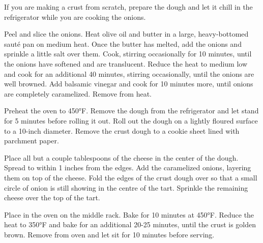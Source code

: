 If you are making a crust from scratch, prepare the dough and let it chill in the refrigerator while 
you are cooking the onions.

Peel and slice the onions.
Heat olive oil and butter in a large, heavy-bottomed sauté pan on medium heat. 
Once the butter has melted, add the onions and sprinkle a little salt over them. 
Cook, stirring occasionally for 10 minutes, until the onions have softened and are translucent. 
Reduce the heat to medium low and cook for an additional 40 minutes, stirring occasionally, until 
the onions are well browned. Add balsamic vinegar and cook for 10 minutes more, until onions are 
completely caramelized. Remove from heat.

Preheat the oven to 450°F. Remove the dough from the refrigerator and let stand for 5 minutes before
rolling it out. Roll out the dough on a lightly floured surface to a 10-inch diameter. 
Remove the crust dough to a cookie sheet lined with parchment paper.

Place all but a couple tablespoons of the cheese in the center of the dough. 
Spread to within 1 inches from the edges. Add the caramelized onions, layering them on 
top of the cheese. Fold the edges of the crust dough over so that a small circle of onion is still 
showing in the centre of the tart. Sprinkle the remaining cheese over the top of the tart.

Place in the oven on the middle rack. Bake for 10 minutes at 450°F. Reduce the heat to 350°F and 
bake for an additional 20-25 minutes, until the crust is golden brown. Remove from oven and let sit 
for 10 minutes before serving.
